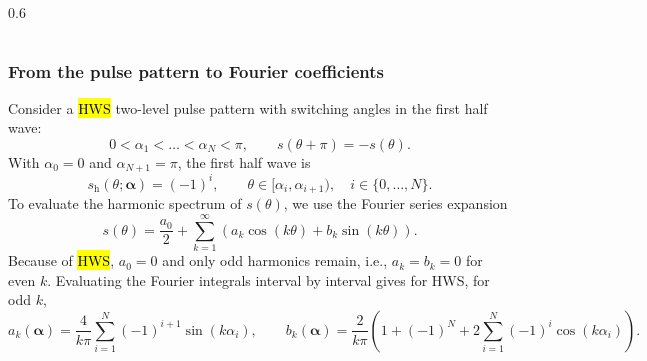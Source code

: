 \begin{frame}
\begin{columns}[t,onlytextwidth]
\begin{column}{0.6\textwidth}
{}
        \end{column}
    \end{columns}
\end{frame}

\begin{frame}
    \frametitle{From the pulse pattern to Fourier coefficients}
    Consider a \hl{HWS} two-level pulse pattern with switching angles in the first half wave:
    \begin{equation}
        0<\alpha_1<\ldots<\alpha_N<\pi,
        \qquad
        s(\theta+\pi)=-s(\theta).
    \end{equation}\pause
    With $\alpha_0=0$ and $\alpha_{N+1}=\pi$, the first half wave is
    \begin{equation}
        s_\mathrm{h}(\theta;\bm{\alpha}) = (-1)^i,
        \qquad
        \theta\in[\alpha_i,\alpha_{i+1}),
        \quad i\in\{0,\ldots,N\}.
    \end{equation}\pause
    To evaluate the harmonic spectrum of \(s(\theta)\), we use the Fourier series expansion
    \begin{equation}
        s(\theta)=\frac{a_0}{2}+\sum_{k=1}^{\infty}\left(a_k\cos(k\theta)+b_k\sin(k\theta)\right).
    \end{equation}\pause
    Because of \hl{HWS}, \(a_0=0\) and only odd harmonics remain, i.e., \(a_k=b_k=0\) for even \(k\). \pause Evaluating the Fourier integrals interval by interval gives for HWS, for odd \(k\),
    \begin{equation}
        a_k(\bm{\alpha})=\frac{4}{k\pi}\sum_{i=1}^{N}(-1)^{i+1}\sin(k\alpha_i),
        \qquad
        b_k(\bm{\alpha})=\frac{2}{k\pi}\left(1+(-1)^{N}+2\sum_{i=1}^{N}(-1)^{i}\cos(k\alpha_i)\right).
    \end{equation}
\end{frame}

